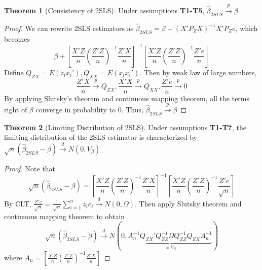 \documentclass[12pt]{article}
\theoremstyle{definition}
\theoremstyle{property}
\theoremstyle{assumption}
\theoremstyle{example}
\theoremstyle{comment}
\newtheorem{theorem}{Theorem}[section]
\begin{document}
\begin{mdframed}[backgroundcolor=green!5] 
\begin{theorem}[Consistency of 2SLS] Under assumptions \textbf{T1-T5}, $\hat{\beta}_{2SLS}\xrightarrow{p}\beta$
\begin{proof}
We can rewrite 2SLS estimators as $\hat{\beta}_{2SLS}=\beta+(X'P_ZX)^{-1}X'P_Ze$, which becomes
\small{\[
\beta+\left[\frac{X'Z}{n}\left(\frac{Z'Z}{n}\right)^{-1} \frac{Z'X}{n}\right]^{-1}\left[\frac{X'Z}{n}\left(\frac{Z'Z}{n}\right)^{-1} \frac{Z'e}{n}\right]
\]}\normalsize
Define $Q_{ZX}=E(z_ix_i'), Q_{XX}=E(x_ix_i')$. Then by weak law of large numbers,
\small{\[
\frac{Z'X}{n}\xrightarrow{p}Q_{ZX}, \frac{X'X}{n}\xrightarrow{p}Q_{XX}, \frac{Z'e}{n}\xrightarrow{p}0
\]}\normalsize
By applying Slutsky's theorem and continuous mapping theorem, all the terms right of $\beta$ converge in probability to 0. Thus, $\hat{\beta}_{2SLS}\xrightarrow{p}\beta$
\end{proof}
\end{theorem}
\begin{theorem}[Limiting Distribution of 2SLS] Under assumptions \textbf{T1-T7}, the limiting distribution of the 2SLS estimator is characterized by $\sqrt{n}(\hat{\beta}_{2SLS}-\beta)\xrightarrow{d}N(0,V_\beta)$
\begin{proof}
Note that
\small{\[
\sqrt{n}(\hat{\beta}_{2SLS}-\beta)=\left[\frac{X'Z}{n}\left(\frac{Z'Z}{n}\right)^{-1} \frac{Z'X}{n}\right]^{-1}\left[\frac{X'Z}{n}\left(\frac{Z'Z}{n}\right)^{-1} \frac{Z'e}{\sqrt{n}}\right]
\]}\normalsize
By CLT, $\frac{Z'e}{\sqrt{n}}=\frac{1}{\sqrt{n}}\sum_{i=1}^nz_ie_i\xrightarrow{d}N(0,\Omega)$. Then apply Slutsky theorem and continuous mapping theorem to obtain
\small{\[
\sqrt{n}(\hat{\beta}_{2SLS}-\beta)\xrightarrow{d}N(0,\underbrace{A_n^{-1}Q_{ZX}'Q_{ZZ}^{-1}\Omega Q_{ZZ}^{-1}Q_{ZX}A_n^{-1}}_{=V_\beta})
\]}\normalsize
where $A_n=\left[\frac{X'Z}{n}\left(\frac{Z'Z}{n}\right)^{-1} \frac{Z'X}{n}\right]$
\end{proof}
\end{theorem}
\end{mdframed}
\end{document}
